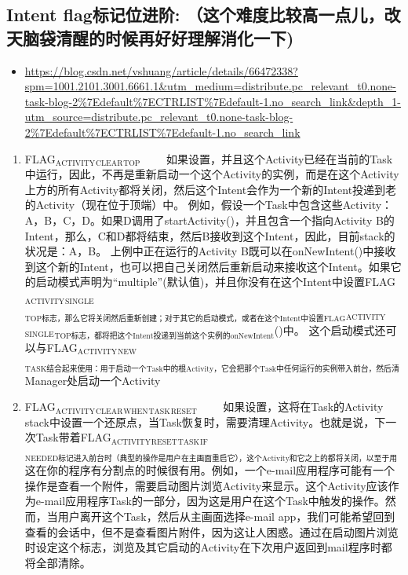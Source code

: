 \documentclass[9pt, b5paaper]{book}
\begin{document}
\subsection{Intent flag标记位进阶: （这个难度比较高一点儿，改天脑袋清醒的时候再好好理解消化一下)}
\label{sec-4-6-3}
\begin{itemize}
\item \url{https://blog.csdn.net/vshuang/article/details/66472338?spm=1001.2101.3001.6661.1&utm_medium=distribute.pc_relevant_t0.none-task-blog-2\%7Edefault\%7ECTRLIST\%7Edefault-1.no_search_link&depth_1-utm_source=distribute.pc_relevant_t0.none-task-blog-2\%7Edefault\%7ECTRLIST\%7Edefault-1.no_search_link}
\end{itemize}
\begin{enumerate}
\item FLAG$_{\text{ACTIVITY}}$$_{\text{CLEAR}}$$_{\text{TOP}}$
\label{sec-4-6-3-1}
　　如果设置，并且这个Activity已经在当前的Task中运行，因此，不再是重新启动一个这个Activity的实例，而是在这个Activity上方的所有Activity都将关闭，然后这个Intent会作为一个新的Intent投递到老的Activity（现在位于顶端）中。      例如，假设一个Task中包含这些Activity：A，B，C，D。如果D调用了startActivity()，并且包含一个指向Activity B的Intent，那么，C和D都将结束，然后B接收到这个Intent，因此，目前stack的状况是：A，B。      上例中正在运行的Activity B既可以在onNewIntent()中接收到这个新的Intent，也可以把自己关闭然后重新启动来接收这个Intent。如果它的启动模式声明为“multiple”(默认值)，并且你没有在这个Intent中设置FLAG$_{\text{ACTIVITY}}$$_{\text{SINGLE}}$$_{\text{TOP标志，那么它将关闭然后重新创建；对于其它的启动模式，或者在这个Intent中设置FLAG}}$$_{\text{ACTIVITY}}$$_{\text{SINGLE}}$$_{\text{TOP标志，都将把这个Intent投递到当前这个实例的onNewIntent}}$()中。      这个启动模式还可以与FLAG$_{\text{ACTIVITY}}$$_{\text{NEW}}$$_{\text{TASK结合起来使用：用于启动一个Task中的根Activity，它会把那个Task中任何运行的实例带入前台，然后清除它直到根Activity。这非常有用，例如，当从Notification}}$ Manager处启动一个Activity
\item FLAG$_{\text{ACTIVITY}}$$_{\text{CLEAR}}$$_{\text{WHEN}}$$_{\text{TASK}}$$_{\text{RESET}}$
\label{sec-4-6-3-2}
　　如果设置，这将在Task的Activity stack中设置一个还原点，当Task恢复时，需要清理Activity。也就是说，下一次Task带着FLAG$_{\text{ACTIVITY}}$$_{\text{RESET}}$$_{\text{TASK}}$$_{\text{IF}}$$_{\text{NEEDED标记进入前台时（典型的操作是用户在主画面重启它），这个Activity和它之上的都将关闭，以至于用户不能再返回到它们，但是可以回到之前的Activity。}}$      这在你的程序有分割点的时候很有用。例如，一个e-mail应用程序可能有一个操作是查看一个附件，需要启动图片浏览Activity来显示。这个Activity应该作为e-mail应用程序Task的一部分，因为这是用户在这个Task中触发的操作。然而，当用户离开这个Task，然后从主画面选择e-mail app，我们可能希望回到查看的会话中，但不是查看图片附件，因为这让人困惑。通过在启动图片浏览时设定这个标志，浏览及其它启动的Activity在下次用户返回到mail程序时都将全部清除。
$$
\end{enumerate}
\end{document}

